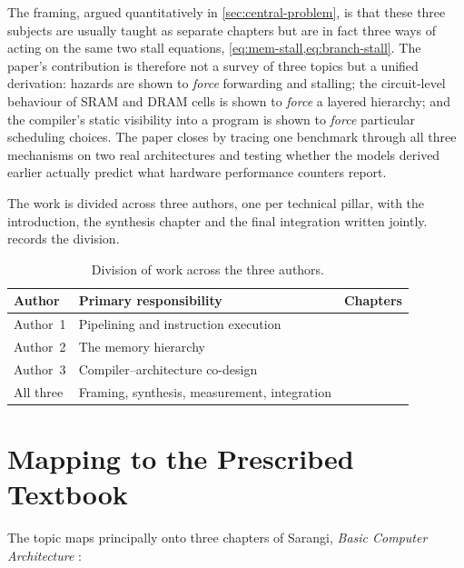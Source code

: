 \documentclass[12pt,a4paper]{report}
\begin{document}
The framing, argued quantitatively in \cref{sec:central-problem}, is
that these three subjects are usually taught as separate chapters but
are in fact three ways of acting on the same two stall equations,
\cref{eq:mem-stall,eq:branch-stall}. The paper's contribution is
therefore not a survey of three topics but a unified derivation: hazards
are shown to \emph{force} forwarding and stalling; the circuit-level
behaviour of SRAM and DRAM cells is shown to \emph{force} a layered
hierarchy; and the compiler's static visibility into a program is shown
to \emph{force} particular scheduling choices. The paper closes by
tracing one benchmark through all three mechanisms on two real
architectures and testing whether the models derived earlier actually
predict what hardware performance counters report.

The work is divided across three authors, one per technical pillar, with
the introduction, the synthesis chapter and the final integration
written jointly.  records the division.

\begin{table}[htbp]
\centering
\caption{Division of work across the three authors.}
\label{tab:author-split}
\begin{tabular}{@{}L{0.18\textwidth}L{0.34\textwidth}L{0.38\textwidth}@{}}
\toprule
\textbf{Author} & \textbf{Primary responsibility} & \textbf{Chapters} \\
\midrule
Author~1 & Pipelining and instruction execution &
   \\
Author~2 & The memory hierarchy &
   \\
Author~3 & Compiler--architecture co-design &
   \\
All three & Framing, synthesis, measurement, integration &
   \\
\bottomrule
\end{tabular}
\end{table}

\section{Mapping to the Prescribed Textbook}
\label{sec:app-textbook}

The topic maps principally onto three chapters of Sarangi,
\emph{Basic Computer Architecture} \cite{sarangi}:
\end{document}

